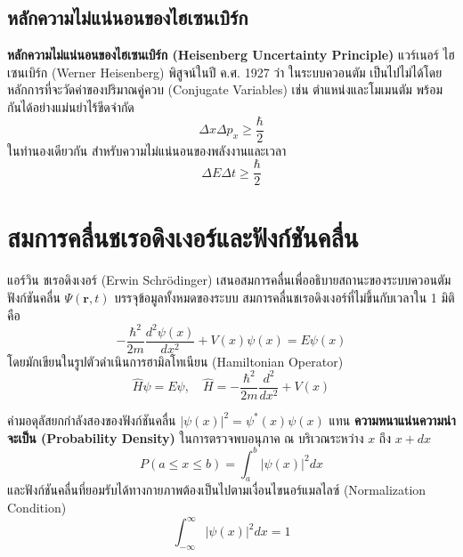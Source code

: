 \subsection{หลักความไม่แน่นอนของไฮเซนเบิร์ก}
\textbf{หลักความไม่แน่นอนของไฮเซนเบิร์ก (Heisenberg Uncertainty Principle)} แวร์เนอร์ ไฮเซนเบิร์ก (Werner Heisenberg) พิสูจน์ในปี ค.ศ. 1927 ว่า ในระบบควอนตัม เป็นไปไม่ได้โดยหลักการที่จะวัดค่าของปริมาณคู่ควบ (Conjugate Variables) เช่น ตำแหน่งและโมเมนตัม พร้อมกันได้อย่างแม่นยำไร้ขีดจำกัด
\begin{equation}
\Delta x \Delta p_x \ge \frac{\hbar}{2}
\end{equation}
ในทำนองเดียวกัน สำหรับความไม่แน่นอนของพลังงานและเวลา
\begin{equation}
\Delta E \Delta t \ge \frac{\hbar}{2}
\end{equation}

\section{สมการคลื่นชเรอดิงเงอร์และฟังก์ชันคลื่น}

แอร์วิน ชเรอดิงเงอร์ (Erwin Schrödinger) เสนอสมการคลื่นเพื่ออธิบายสถานะของระบบควอนตัม ฟังก์ชันคลื่น $\Psi(\mathbf{r}, t)$ บรรจุข้อมูลทั้งหมดของระบบ สมการคลื่นชเรอดิงเงอร์ที่ไม่ขึ้นกับเวลาใน 1 มิติคือ
\begin{equation}
-\frac{\hbar^2}{2m} \frac{d^2 \psi(x)}{dx^2} + V(x)\psi(x) = E\psi(x)
\end{equation}
โดยมักเขียนในรูปตัวดำเนินการฮามิลโทเนียน (Hamiltonian Operator)
\begin{equation}
\hat{H}\psi = E\psi, \quad \hat{H} = -\frac{\hbar^2}{2m}\frac{d^2}{dx^2} + V(x)
\end{equation}

\begin{mathdefinition}
ค่ามอดุลัสยกกำลังสองของฟังก์ชันคลื่น $|\psi(x)|^2 = \psi^*(x)\psi(x)$ แทน \textbf{ความหนาแน่นความน่าจะเป็น (Probability Density)} ในการตรวจพบอนุภาค ณ บริเวณระหว่าง $x$ ถึง $x + dx$
\begin{equation}
P(a \le x \le b) = \int_a^b |\psi(x)|^2 dx
\end{equation}
และฟังก์ชันคลื่นที่ยอมรับได้ทางกายภาพต้องเป็นไปตามเงื่อนไขนอร์แมลไลซ์ (Normalization Condition)
\begin{equation}
\int_{-\infty}^{\infty} |\psi(x)|^2 dx = 1
\end{equation}
\end{mathdefinition}

